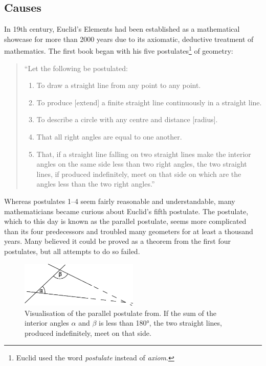 \documentclass[hidelinks]{article}
\theoremstyle{plain}
\theoremstyle{definition}
\theoremstyle{rem}
\begin{document}
\subsection{Causes}\label{ssec_causes}
In 19th century, Euclid's Elements had been established as a mathematical showcase for more than 2000 years due to its axiomatic, deductive treatment of mathematics. The first book began with his five postulates\footnote{Euclid used the word \textit{postulate} instead of \textit{axiom}.} of geometry:
\begin{quote}
``Let the following be postulated:
\begin{enumerate}
\item To draw a straight line from any point to any point.
\item To produce [extend] a finite straight line continuously in a straight line.
\item To describe a circle with any centre and distance [radius].
\item That all right angles are equal to one another.
\item That, if a straight line falling on two straight lines make the interior angles on the same side less than two right angles, the two straight lines, if produced indefinitely, meet on that side on which are the angles less than the two right angles.''
\end{enumerate}
\end{quote}
Whereas postulates 1--4 seem fairly reasonable and understandable, many mathematicians became curious about Euclid's fifth postulate. The postulate, which to this day is known as the parallel postulate, seems more complicated than its four predecessors and troubled many geometers for at least a thousand years. Many believed it could be proved as a theorem from the first four postulates, but all attempts to do so failed. 

\begin{figure}[h]
	\centering
	\includegraphics[width=0.5\textwidth]{img/parallel_postulate.png}
	\caption{Visualisation of the parallel postulate from\cite[Wikipedia]{wiki_parallel_postulate}. If the sum of the interior angles $\alpha$ and $\beta$ is less than 180°, the two straight lines, produced indefinitely, meet on that side.}
\end{figure}
\end{document}
